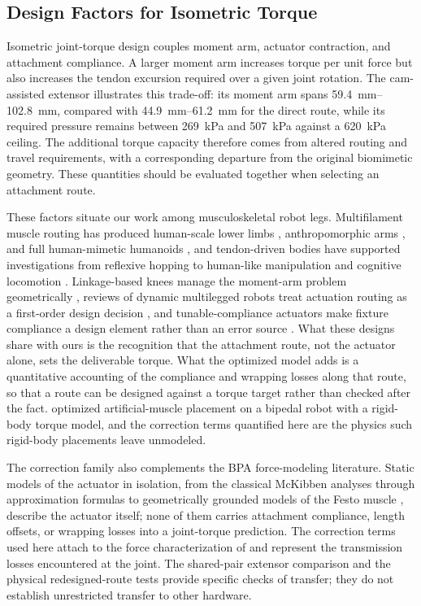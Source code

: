 \documentclass[utf8]{FrontiersinHarvard} %
\begin{document}
\subsection{Design Factors for Isometric Torque}\label{sec:design_factors}

Isometric joint-torque design couples moment arm, actuator contraction, and attachment compliance. A larger moment arm increases torque per unit force but also increases the tendon excursion required over a given joint rotation. The cam-assisted extensor illustrates this trade-off: its moment arm spans \qtyrange{59.4}{102.8}{\mm}, compared with \qtyrange{44.9}{61.2}{\mm} for the direct route, while its required pressure remains between \qty{269}{\kPa} and \qty{507}{\kPa} against a \qty{620}{\kPa} ceiling. The additional torque capacity therefore comes from altered routing and travel requirements, with a corresponding departure from the original biomimetic geometry. These quantities should be evaluated together when selecting an attachment route.

These factors situate our work among musculoskeletal robot legs. Multifilament muscle routing has produced human-scale lower limbs \citep{kurumaya_musculoskeletal_2016}, anthropomorphic arms \citep{hitzmann_anthropomorphic_2018}, and full human-mimetic humanoids \citep{asano_musculoskeletal_2019}, and tendon-driven bodies have supported investigations from reflexive hopping \citep{liu_robotic_2018} to human-like manipulation \citep{chen_realizing_2019} and cognitive locomotion \citep{schilling_adaptive_2022}. Linkage-based knees manage the moment-arm problem geometrically \citep{romero_four-bar_2020}, reviews of dynamic multilegged robots treat actuation routing as a first-order design decision \citep{he_mechanism_2020}, and tunable-compliance actuators make fixture compliance a design element rather than an error source \citep{leibach_development_2020}. What these designs share with ours is the recognition that the attachment route, not the actuator alone, sets the deliverable torque. What the optimized model adds is a quantitative accounting of the compliance and wrapping losses along that route, so that a route can be designed against a torque target rather than checked after the fact. \citet{morrow_optimization_2020} optimized artificial-muscle placement on a bipedal robot with a rigid-body torque model, and the correction terms quantified here are the physics such rigid-body placements leave unmodeled.

The correction family also complements the BPA force-modeling literature. Static models of the actuator in isolation, from the classical McKibben analyses \citep{chou_measurement_1996} through approximation formulas \citep{sarosi_new_2012} to geometrically grounded models of the Festo muscle \citep{martens_modeling_2017, tondu_static_2022}, describe the actuator itself; none of them carries attachment compliance, length offsets, or wrapping losses into a joint-torque prediction. The correction terms used here attach to the force characterization of \citet{bolen_2026} and represent the transmission losses encountered at the joint. The shared-pair extensor comparison and the physical redesigned-route tests provide specific checks of transfer; they do not establish unrestricted transfer to other hardware.
\end{document}
